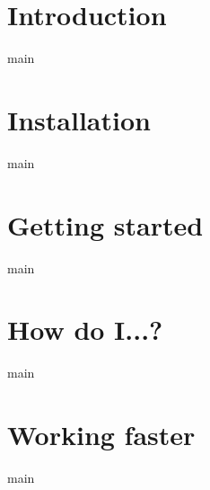 \documentclass[oneside]{report}
\begin{document}
	\tableofcontents

	\chapter{Introduction}
		{main}

	\chapter{Installation}
		{main}

	\chapter{Getting started}
		{main}

	\chapter{How do I...?}
		{main}

	\chapter{Working faster}
		{main}
\end{document}
